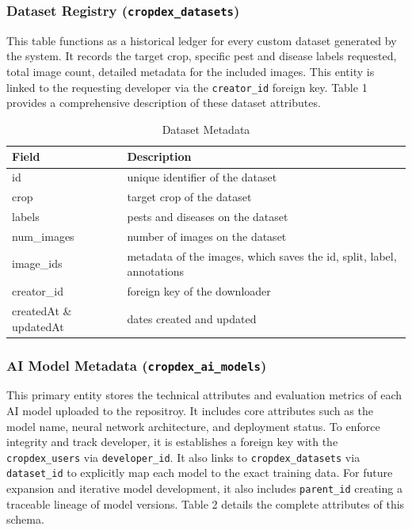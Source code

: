 \documentclass[journal]{./IEEE/IEEEtran}
\begin{document}
\subsubsection{Dataset Registry (\texttt{cropdex\_datasets})}
This table functions as a historical ledger for every custom dataset generated by the system. It records the target crop, specific pest and disease labels requested, total image count, detailed metadata for the included images. This entity is linked to the requesting developer via the \texttt{creator\_id} foreign key. Table 1 provides a comprehensive description of these dataset attributes.

\begin{table}[htbp]
    \centering
    \caption{Dataset Metadata}
    \label{tab:dataset_metadata}
    \begin{tabular}{p{} p{}}
        \toprule
        \textbf{Field}      & \textbf{Description} \\ 
        \midrule
        id                      & unique identifier of the dataset \\ 
        crop                    & target crop of the dataset \\ 
        labels                  & pests and diseases on the dataset \\ 
        num\_images             & number of images on the dataset \\ 
        image\_ids              & metadata of the images, which saves the id, split, label, annotations \\ 
        creator\_id             & foreign key of the downloader \\ 
        createdAt \& updatedAt  & dates created and updated \\
        \bottomrule
    \end{tabular}
\end{table}

\subsubsection{AI Model Metadata (\texttt{cropdex\_ai\_models})}
This primary entity stores the technical attributes and evaluation metrics of each AI model uploaded to the repositroy. It includes core attributes such as the model name, neural network architecture, and deployment status. To enforce integrity and track developer, it is establishes a foreign key with the \texttt{cropdex\_users} via \texttt{developer\_id}. It also links to \texttt{cropdex\_datasets} via \texttt{dataset\_id} to explicitly map each model to the exact training data. For future expansion and iterative model development, it also includes \texttt{parent\_id} creating a traceable lineage of model versions. Table 2 details the complete attributes of this schema.
\end{document}
